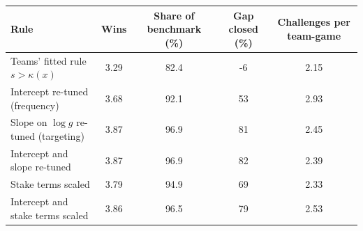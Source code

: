 \begin{tabular}{lcccc}
\toprule
Rule & Wins & Share of benchmark (\%) & Gap closed (\%) & Challenges per team-game \\
\midrule
Teams' fitted rule $s>\kappa(x)$ & 3.29 & 82.4 & -6 & 2.15 \\
Intercept re-tuned (frequency) & 3.68 & 92.1 & 53 & 2.93 \\
Slope on $\log g$ re-tuned (targeting) & 3.87 & 96.9 & 81 & 2.45 \\
Intercept and slope re-tuned & 3.87 & 96.9 & 82 & 2.39 \\
Stake terms scaled & 3.79 & 94.9 & 69 & 2.33 \\
Intercept and stake terms scaled & 3.86 & 96.5 & 79 & 2.53 \\
\bottomrule
\end{tabular}
